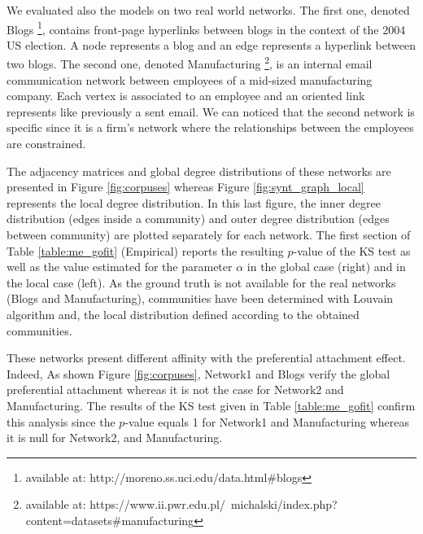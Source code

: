 

We evaluated also the models on two real world networks.
The first one, denoted Blogs \footnote{available at: http://moreno.ss.uci.edu/data.html\#blogs}, contains front-page hyperlinks between blogs in the context of the 2004 US election. A node represents a blog and an edge represents a hyperlink between two blogs.
The second one, denoted Manufacturing \footnote{available at: https://www.ii.pwr.edu.pl/~michalski/index.php?content=datasets\#manufacturing}, is an internal email communication network between employees of a mid-sized manufacturing company. Each vertex is associated  to an employee and an oriented link represents like previously a sent email. We can noticed that the second network is specific since it is a firm's network where the relationships between the employees are constrained. 


The adjacency matrices and global degree distributions of these networks are presented in Figure \ref{fig:corpuses} whereas Figure \ref{fig:synt_graph_local} represents the local degree distribution. In this last figure, the inner degree distribution (edges inside a community) and outer degree distribution (edges between community) are plotted separately for each network. The first section of Table \ref{table:me_gofit} (Empirical) reports the resulting $p$-value of the KS test as well as the value estimated for the parameter  $\alpha$ in the global case (right) and in the local case (left). As the ground truth is not available for the real networks (Blogs and Manufacturing), communities have been determined with Louvain algorithm \cite{Blondel2008} and, the local distribution defined according to the obtained communities. 

These networks present  different affinity with the preferential attachment effect.
Indeed, As shown Figure \ref{fig:corpuses}, Network1 and Blogs verify the  global preferential attachment whereas it is not the case for Network2 and Manufacturing. The results of the KS test given in Table \ref{table:me_gofit} confirm this analysis since the $p$-value equals 1 for Network1 and Manufacturing whereas it is null for Network2, and Manufacturing.

